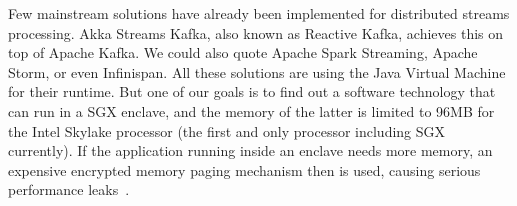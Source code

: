 Few mainstream solutions have already been implemented for distributed streams processing.
Akka Streams Kafka, also known as Reactive Kafka\cite{reactivekafka}, achieves this on top of Apache Kafka\cite{apachekafka}.
We could also quote  Apache Spark Streaming\cite{apachesparkstreaming}, Apache Storm\cite{apachestorm}, or even Infinispan\cite{infinispan}.
All these solutions are using the Java Virtual Machine for their runtime.
But one of our goals is to find out a software technology that can run in a SGX enclave, and the memory of the latter is limited to 96MB for the Intel Skylake processor (the first and only processor including SGX currently)\cite{costan_intel}.
If the application running inside an enclave needs more memory, an expensive encrypted memory paging mechanism then is used, causing serious performance leaks~\cite{brenner_securekeeper:_2016}.

